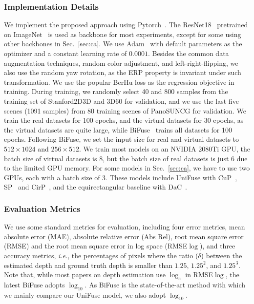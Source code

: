 \documentclass[letterpaper, 10 pt, conference]{ieeeconf}
\def\ie{\emph{i.e.}}
\begin{document}
\subsubsection{Implementation Details}
We implement the proposed approach using Pytorch~\cite{paszke2017automatic}. 
The ResNet18~\cite{he2016deep} pretrained on ImageNet~\cite{deng2009imagenet} is used as backbone for most experiments, except for some using other backbones in Sec.~\ref{sec:ca}.
We use Adam~\cite{kingma2014adam} with default parameters as the optimizer and a constant learning rate of $0.0001$. 
Besides the common data augmentation techniques, random color adjustment, and left-right-flipping, we also use the random yaw rotation, as the ERP property is invariant under such transformation. 
We use the popular BerHu loss \cite{laina2016deeper} as the regression objective in training. 
During training, we randomly select 40 and 800 samples from the training set of Stanford2D3D and 3D60 for validation, and we use the last five scenes (1091 samples) from 80 training scenes of PanoSUNCG for validation. 
We train the real datasets for 100 epochs, and the virtual datasets for 30 epochs, as the virtual datasets are quite large, while BiFuse~\cite{wang2020bifuse} trains all datasets for 100 epochs. 
Following BiFuse, we set the input size for real and virtual datasets to $512\times1024$ and $256\times 512$. We train most models on an NVIDIA 2080Ti GPU, the batch size of virtual datasets is 8, but the batch size of real datasets is just 6 due to the limited GPU memory. {For some models in Sec.~\ref{sec:ca}, we have to use two GPUs, each with a batch size of 3. These models include UniFuse with CuP~\cite{cheng2018cube}, SP~\cite{wang2020bifuse} and CirP~\cite{wang2018omnidirectional}, and the equirectangular baseline with DaC~\cite{coors2018spherenet}.}


\subsubsection{Evaluation Metrics}
We use some standard metrics for evaluation, including four error metrics, mean absolute error (MAE), absolute relative error (Abs Rel), root mean square error (RMSE) and the root mean square error in log space (RMSE$\log$), and three accuracy metrics, \ie, the percentages of pixels where the ratio ($\delta$) between the estimated depth and ground truth depth is smaller than $1.25$, $1.25^2$, and $1.25^3$. Note that, while most papers on depth estimation use $\log_{e}$ in RMSE$\log$, the latest BiFuse adopts $\log_{10}$. As BiFuse is the state-of-the-art method with which we mainly compare our UniFuse model, we also adopt $\log_{10}$. 
\end{document}
